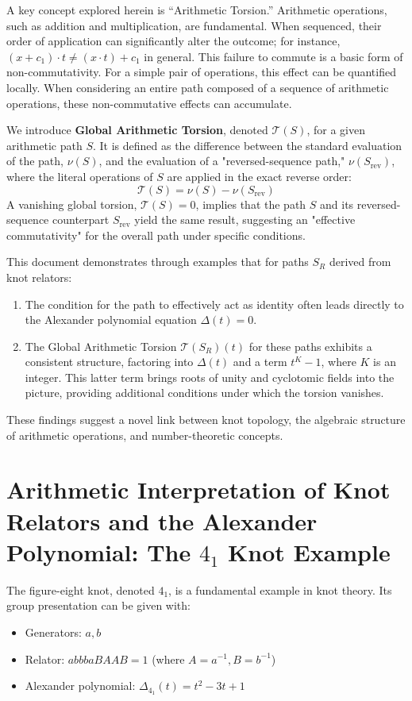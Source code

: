 \documentclass{article}[a4paper,12pt]
\begin{document}
A key concept explored herein is ``Arithmetic Torsion.'' Arithmetic operations, such as addition and multiplication, are fundamental. When sequenced, their order of application can significantly alter the outcome; for instance, $(x+c_1) \cdot t \neq (x \cdot t) + c_1$ in general. This failure to commute is a basic form of non-commutativity. For a simple pair of operations, this effect can be quantified locally. When considering an entire path composed of a sequence of arithmetic operations, these non-commutative effects can accumulate.

We introduce \textbf{Global Arithmetic Torsion}, denoted $\mathcal{T}(S)$, for a given arithmetic path $S$. It is defined as the difference between the standard evaluation of the path, $\nu(S)$, and the evaluation of a "reversed-sequence path," $\nu(S_{\text{rev}})$, where the literal operations of $S$ are applied in the exact reverse order:
\[ \mathcal{T}(S) = \nu(S) - \nu(S_{\text{rev}}) \]
A vanishing global torsion, $\mathcal{T}(S)=0$, implies that the path $S$ and its reversed-sequence counterpart $S_{\text{rev}}$ yield the same result, suggesting an "effective commutativity" for the overall path under specific conditions.

This document demonstrates through examples that for paths $S_R$ derived from knot relators:
\begin{enumerate}
    \item The condition for the path to effectively act as identity often leads directly to the Alexander polynomial equation $\Delta(t)=0$.
    \item The Global Arithmetic Torsion $\mathcal{T}(S_R)(t)$ for these paths exhibits a consistent structure, factoring into $\Delta(t)$ and a term $t^K-1$, where $K$ is an integer. This latter term brings roots of unity and cyclotomic fields into the picture, providing additional conditions under which the torsion vanishes.
\end{enumerate}
These findings suggest a novel link between knot topology, the algebraic structure of arithmetic operations, and number-theoretic concepts.

\section{Arithmetic Interpretation of Knot Relators and the Alexander Polynomial: The $4_1$ Knot Example}

The figure-eight knot, denoted $4_1$, is a fundamental example in knot theory. Its group presentation can be given with:
\begin{itemize}
    \item Generators: $a, b$
    \item Relator: $abbbaBAAB = 1$ (where $A=a^{-1}, B=b^{-1}$)
    \item Alexander polynomial: $\Delta_{4_1}(t) = t^2 - 3t + 1$
\end{itemize}
\end{document}
